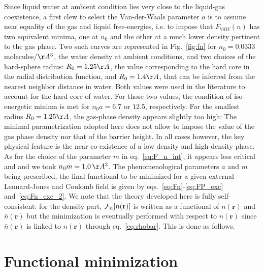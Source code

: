 \documentclass[aip,jcp,preprint]{revtex4-1}
\newcommand{\rr}{\mathbf{r}}
\newcommand{\rhon}{{n\left({\mathbf r}\right)}}
\newcommand{\F}{{\cal F}}
\newcommand{\rhonbar}{\bar{n}({\mathbf r})}
\begin{document}
Since liquid water at ambient condition lies very close to the liquid-gas coexistence, a first clew to select the Van-der-Waals parameter $a$ is to assume near equality of the gas and liquid free-energies, i.e. to impose that $F_{VdW}(n)$ has two equivalent minima, one at $n_0$ and the other at a much lower density pertinent to the gas phase. Two such curves are represented in Fig.~\ref{fig:fn} for $n_0=0.0333$ molecules/$\AA^3$, the water density at ambient conditions, and two choices of the hard-sphere radius: $R_0=1.25 \AA$, the value corresponding to the hard core in the radial distribution function, and $R_0 = 1.4 \AA$, that can be inferred from  the nearest neighbor distance in water. Both values were used in the literature\cite{oleksy10,zhao-wu11,levesque12_1} to account for the hard core of water. For those two values, the condition of  iso-energetic minima is met for  $n_0a = 6.7$ or $12.5$, respectively. For the smallest radius $R_0 = 1.25 \AA$, the gas-phase density appears slightly too high:  The minimal parametrization adopted here does not allow to impose the value of the gas phase density nor that of the barrier height. In all cases however, the key physical feature is the near co-existence of a low density and high density phase. As for the choice of the parameter  $m$ in eq.~\ref{eq:F_n_int}, it  appears less critical and and we took $n_0m=1.0 \, \AA^2$.
The phenomenological parameters $a$ and $m$ being prescribed, the final functional to be minimized for a given external Lennard-Jones and Coulomb field is given by eqs.~\ref{eq:Fn}-\ref{eq:FP_exc} and~\ref{eq:Fn_exc_2}. We note that the theory developed here is fully self-consistent: for the density part, $\F_n[n(\rr)]$ is written  as a functional of $\rhon$ and $\rhonbar$ but the minimization is eventually performed with respect to  $\rhon$ since $\rhonbar$ is  linked to $\rhon$ through eq.~{\ref{eq:rhobar}}. This is done as follows.




\section{Functional minimization}
\end{document}
